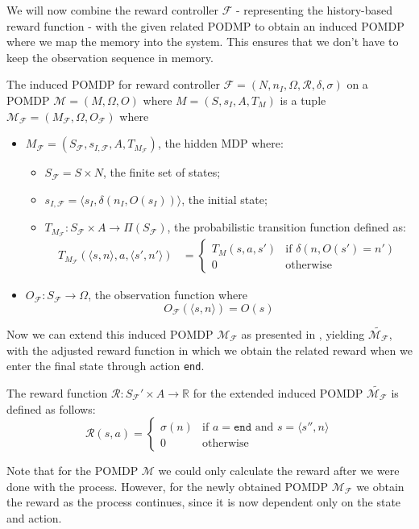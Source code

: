 We will now combine the reward controller $\mathcal{F}$ - representing the history-based reward function - with the given related PODMP to obtain an induced POMDP where we map the memory into the system. This ensures that we don't have to keep the observation sequence in memory. 


\begin{definition}
	The induced POMDP for reward controller $\mathcal{F}=(N, n_I, \Omega, \mathcal{R}, \delta, \sigma)$ on a POMDP $\mathcal{M}=(M,\Omega,O)$ where $M=(S,s_I,A,T_{M})$ is a tuple $\mathcal{M_\mathcal{F}}=(M_\mathcal{F},\Omega,O_\mathcal{F})$ where 
	\begin{itemize}
		\item $M_\mathcal{F} = (S_\mathcal{F},s_{I,\mathcal{F}}, A, T_{M_\mathcal{F}})$, the hidden MDP where:
		\begin{itemize}
			\item $S_\mathcal{F}=S\times N$, the finite set of states;
			\item $s_{I,\mathcal{F}} = \langle s_I, \delta(n_I, O(s_I))\rangle$, the initial state;
			\item $T_{M_\mathcal{F}}:S_\mathcal{F}\times A \to \Pi(S_\mathcal{F})$, the probabilistic transition function defined as:
				\begin{align*}				
					T_{M_\mathcal{F}}(\langle s,n\rangle,a,\langle s',n'\rangle) &= \begin{cases}
						T_M(s,a,s') & \text{if } \delta(n,O(s')=n') \\
						0 & \text{otherwise}
					\end{cases}
				\end{align*}
		\end{itemize}
		\item $O_\mathcal{F}:S_\mathcal{F}\to \Omega$, the observation function where 
		\[O_\mathcal{F}(\langle s,n \rangle) = O(s)\]
		\end{itemize}
	\label{d:induced_pomdp}
\end{definition}

Now we can extend this induced POMDP $\mathcal{M}_\mathcal{F}$ as presented in , yielding $\widetilde{\mathcal{M}_\mathcal{F}}$, with the adjusted reward function in which we obtain the related reward when we enter the final state through action \texttt{end}.

\begin{definition}
	\label{def:reward-fuction-extended-induced-pomdp}
	The reward function $\mathcal{R}:S_\mathcal{F}'\times A\to \mathbb{R}$ for the extended induced POMDP $\widetilde{\mathcal{M}_{\mathcal{F}}}$ is defined as follows:
	\[\mathcal{R}(s,a) = \begin{cases}
		\sigma(n) & \text{if } a=\texttt{end} \text{ and } s=\langle s'',n\rangle \\
		0 & \text{otherwise} 
		\end{cases}
	\]
\end{definition}

Note that for the POMDP $\mathcal{M}$ we could only calculate the reward after we were done with the process. However, for the newly obtained POMDP $\mathcal{M}_{\mathcal{F}}$ we obtain the reward as the process continues, since it is now dependent only on the state and action.
